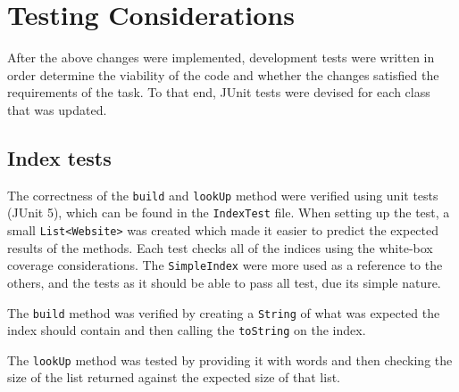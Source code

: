 \section{Testing Considerations}
After the above changes were implemented, development tests were written in order determine the viability of the code and whether the changes satisfied the requirements of the task. To that end, JUnit tests were devised for each class that was updated.

\subsection{Index tests}
The correctness of the {\tt build} and {\tt lookUp} method were verified using unit tests (JUnit 5), which can be found in the {\tt IndexTest} file.
When setting up the test, a small {\tt List<Website>} was created which made it easier to predict the expected results of the methods. Each test
checks all of the indices using the white-box coverage considerations. The {\tt SimpleIndex} were more used as a reference to the others, and the
tests as it should be able to pass all test, due its simple nature.

The {\tt build} method was verified by creating a {\tt String} of what was expected the index should contain and then calling the {\tt toString} on
the index.

The {\tt lookUp} method was tested by providing it with words and then checking the size of the list returned against the expected size of that list.



